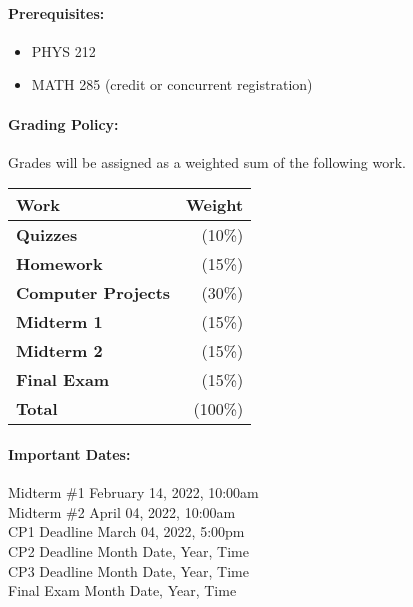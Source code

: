 \documentclass[11pt, a4paper]{article}
\begin{document}
\paragraph{Prerequisites:}
\begin{itemize}
\item PHYS 212
\item MATH 285 (credit or concurrent registration)
\end{itemize}

\paragraph{Grading Policy:} Grades will be assigned as a weighted sum of the following work.

\begin{table}[h]
\begin{tabularx}{\textwidth}{Xr}
\textbf{Work} & \textbf{Weight}\\
\hline
\textbf{Quizzes} & (10\%) \\
\textbf{Homework} & (15\%) \\
\textbf{Computer Projects} & (30\%) \\
\textbf{Midterm 1} & (15\%) \\
\textbf{Midterm 2} & (15\%) \\
\textbf{Final Exam} & (15\%) \\
\hline
\textbf{Total} & (100\%) \\
\end{tabularx}
\end{table}

\paragraph{Important Dates:}
\begin{center} \begin{minipage}{3.8in}
\begin{flushleft}
Midterm \#1       \dotfill February 14, 2022, 10:00am  \\
Midterm \#2       \dotfill April 04, 2022, 10:00am  \\
CP1 Deadline      \dotfill March 04, 2022, 5:00pm  \\
CP2 Deadline      \dotfill Month Date, Year, Time  \\
CP3 Deadline      \dotfill Month Date, Year, Time  \\
Final Exam        \dotfill Month Date, Year, Time  \\
\end{flushleft}
\end{minipage}
\end{center}
\end{document}
